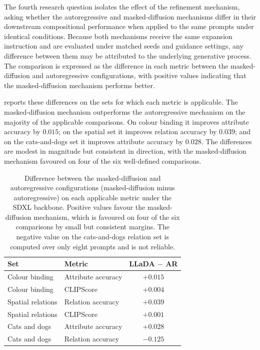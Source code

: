 \documentclass[a4paper,twoside,12pt]{report}
\begin{document}
The fourth research question isolates the effect of the refinement mechanism,
asking whether the autoregressive and masked-diffusion mechanisms differ in
their downstream compositional performance when applied to the same prompts
under identical conditions. Because both mechanisms receive the same expansion
instruction and are evaluated under matched seeds and guidance settings, any
difference between them may be attributed to the underlying generative process.
The comparison is expressed as the difference in each metric between the
masked-diffusion and autoregressive configurations, with positive values
indicating that the masked-diffusion mechanism performs better.

 reports these differences on the sets for which each
metric is applicable. The masked-diffusion mechanism outperforms the
autoregressive mechanism on the majority of the applicable comparisons. On
colour binding it improves attribute accuracy by \(0.015\); on the spatial set
it improves relation accuracy by \(0.039\); and on the cats-and-dogs set it
improves attribute accuracy by \(0.028\). The differences are modest in
magnitude but consistent in direction, with the masked-diffusion mechanism
favoured on four of the six well-defined comparisons.

\begin{table}[H]
\centering
\begin{tabular}{llc}
\toprule
\textbf{Set} & \textbf{Metric} & \textbf{LLaDA \(-\) AR} \\
\midrule
Colour binding    & Attribute accuracy & \(+0.015\) \\
Colour binding    & CLIPScore          & \(+0.004\) \\
Spatial relations & Relation accuracy  & \(+0.039\) \\
Spatial relations & CLIPScore          & \(+0.001\) \\
Cats and dogs     & Attribute accuracy & \(+0.028\) \\
Cats and dogs     & Relation accuracy  & \(-0.125\) \\
\bottomrule
\end{tabular}
\caption[Mechanism comparison under SDXL]{Difference between the
masked-diffusion and autoregressive configurations (masked-diffusion minus
autoregressive) on each applicable metric under the SDXL backbone. Positive
values favour the masked-diffusion mechanism, which is favoured on four of the
six comparisons by small but consistent margins. The negative value on the
cats-and-dogs relation set is computed over only eight prompts and is not
reliable.}
\label{tab:rq4_deltas}
\end{table}
\end{document}
